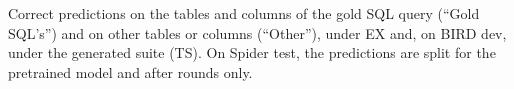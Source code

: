 \begin{table}[!ht]
\caption{Correct predictions on the tables and columns of the gold SQL
query (``Gold SQL's'') and on other tables or columns (``Other''), under
EX and, on BIRD dev, under the generated suite (TS). On Spider test, the
predictions are split for the pretrained model and after
 rounds only.}\label{tab:form}
\footnotesize

\end{table}

